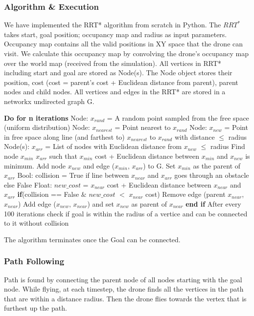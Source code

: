 \subsubsection{Algorithm \& Execution}
We have implemented the RRT* algorithm from scratch in Python.
The $RRT^*$ takes start, goal position; occupancy map and radius as input parameters.
Occupancy map contains all the valid positions in XY space that the drone can visit.
We calculate this occupancy map by convolving the drone's occupancy map over the world map (received from the simulation).
All vertices in RRT* including start and goal are stored as Node(s).
The Node object stores their position, cost (cost = parent's cost + Euclidean distance from parent), parent nodes and child nodes.
All vertices and edges in the RRT* are stored in a networkx\cite{SciPyProceedings_11} undirected graph G.
\begin{algorithmic}[1]
    \State \textbf{Do for n iterations}
    \State Node: $x_{rand}$ = A random point sampled from the free space (uniform distribution)
    \State Node: $x_{nearest}$ = Point nearest to $x_{rand}$
    \State Node: $x_{new}$ = Point in free space along line (and farthest to) $x_{nearest}$ to $x_{rand}$ with distance $\leq$ radius
    \State Node(s): $x_{arr}$ = List of nodes with Euclidean distance from $x_{new}$ $\leq$ radius
    \State Find node $x_{min}$ \in $x_{arr}$ such that $x_{min}$ cost + Euclidean distance between $x_{min}$ and $x_{new}$ is minimum.
    \State Add node $x_{new}$ and edge ($x_{min}$, $x_{arr}$) to G. Set $x_{min}$ as the parent of $x_{arr}$
    \State Bool: collision = True if line between $x_{near}$ and $x_{arr}$ goes through an obstacle else False
    \State Float: $new\_cost$ = $x_{near}$ cost + Euclidean distance between $x_{near}$ and $x_{arr}$
    \State \textbf{if}(collision == False $\&$ $new\_cost$ $<$ $x_{near}$ cost)
    \State\hspace{\algorithmicindent} Remove edge (parent $x_{near}$, $x_{near}$)
    \State\hspace{\algorithmicindent} Add edge ($x_{new}$, $x_{near}$) and set $x_{new}$ as parent of $x_{near}$
    \State \textbf{end if}
    \EndFor
    \State After every 100 iterations check if goal is within the radius of a vertice and can be connected to it without collision
\end{algorithmic}
The algorithm terminates once the Goal can be connected.
\subsubsection{Path Following}
Path is found by connecting the parent node of all nodes starting with the goal node.
While flying, at each timestep, the drone finds all the vertices in the path that are within a distance radius.
Then the drone flies towards the vertex that is furthest up the path.
